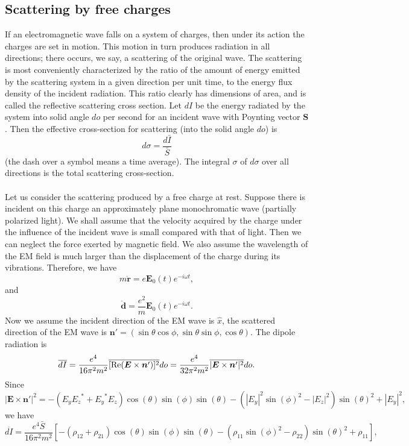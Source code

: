 \subsection{Scattering by free charges}
If an electromagnetic wave falls on a system of charges, then under its action the charges are set in motion. This motion in turn produces radiation in all directions; there occurs, we say, a scattering of the original wave. 
The scattering is most conveniently characterized by the ratio of the amount of energy emitted by the scattering system in a given direction per unit time, to the energy flux density of the incident radiation. This ratio clearly has dimensions of area, and is called the reflective
scattering cross section. 
Let $dI$ be the energy radiated by the system into solid angle $do$ per second for an incident wave with Poynting vector $\bm{S}$. Then the effective cross-section for scattering (into the solid angle $do$) is
\[d\sigma = \frac{d\bar{I}}{\bar{S}} \]
(the dash over a symbol means a time average). 
The integral $\sigma$ of $d\sigma$ over all directions is the total scattering cross-section.
\\ \\
Let us consider the scattering produced by a free charge at rest. Suppose there is incident on this charge an approximately plane monochromatic wave (partially polarized light). We shall assume that the velocity acquired by the charge under the influence of the incident wave is small compared with that of light. Then we can neglect the force exerted by magnetic field. We also assume the wavelength of the EM field is much larger than the displacement of the charge during its vibrations. 
Therefore, we have
\[m\ddot{\bm{r}} = e\bm{E}_0(t) e^{-i\omega t},\]
and
\[\ddot{\bm{d}} = \frac{e^2}{m} \bm{E}_0(t) e^{-i\omega t}.\]
Now we assume the incident direction of the EM wave is $\hat{x}$, the scattered direction of the EM wave is $\bm{n}' =(\sin\theta\cos\phi,\sin\theta\sin\phi,\cos\theta)$. The dipole radiation is
\[\overline{dI} = \frac{e^4}{16\pi^2 m^2}\overline{{[\rm Re}(\bm{E}\times\bm{n}')]^2} do = \frac{e^4}{32\pi^2 m^2}\overline{|\bm{E}\times\bm{n}'|^2} do.\]
Since
\[|\bm{E}\times\bm{n}'|^2 = - ({E_y} {E_z}^* + {E_y}^* {E_z}) \cos\left({\theta}\right) \sin\left({\phi}\right)
\sin\left({\theta}\right) - {\left(|E_y|^{2} \sin\left({\phi}\right)^{2}
- |E_z|^{2}\right)} \sin\left({\theta}\right)^{2} + |E_y|^{2},\]
we have
\[\overline{dI} = \frac{e^4 \bar{S}}{16\pi^2 m^2}[-(\rho_{12}+\rho_{21})\cos\left({\theta}\right)\sin\left({\phi}\right)
\sin\left({\theta}\right) - {\left(\rho_{11} \sin\left({\phi}\right)^{2}
- \rho_{22}\right)} \sin\left({\theta}\right)^{2} + \rho_{11} ],\]
